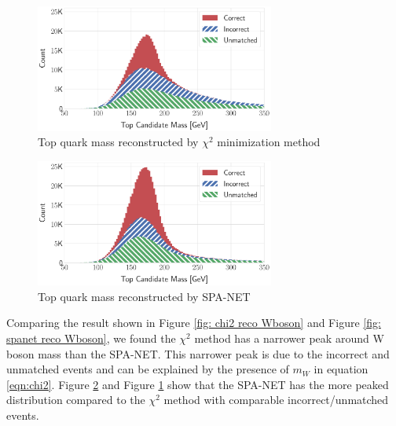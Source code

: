 \begin{figure}[H]
	\centering
	\includegraphics[width=0.7\textwidth]{Figures/network_t_quark_stacked_chi2.pdf}
	\caption{ Top quark mass reconstructed by $\chi^{2}$ minimization method}
	\label{fig: chi2 reco t quark}
\end{figure}
\begin{figure}[H]
	\centering
	\includegraphics[width=0.7\textwidth]{Figures/network_t_quark_stacked.pdf}
	\caption{ Top quark mass reconstructed by SPA-NET}
	\label{fig: spanet reco t quark}
\end{figure}
Comparing the result shown in Figure \ref{fig: chi2 reco Wboson} and Figure \ref{fig: spanet reco Wboson}, we found the $\chi^{2}$ method has a narrower peak around W boson mass than the SPA-NET. This narrower peak is due to the incorrect and unmatched events and can be explained by the presence of $m_{W}$ in equation \ref{eqn:chi2}. Figure \ref{fig: spanet reco t quark} and Figure \ref{fig: chi2 reco t quark} show that the SPA-NET has the more peaked distribution compared to the $\chi^{2}$ method with comparable incorrect/unmatched events.

